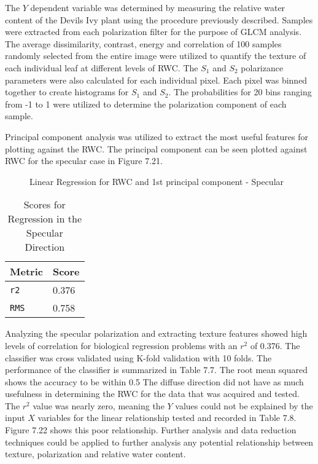 The $Y$ dependent variable was determined by measuring the relative water content of the Devils Ivy plant using the procedure previously described.  Samples were extracted from each polarization filter for the purpose of GLCM analysis.  The average dissimilarity, contrast, energy and correlation of 100 samples randomly selected from the entire image were utilized to quantify the texture of each individual leaf at different levels of RWC.  The $S_1$ and $S_2$ polarizance parameters were also calculated for each individual pixel. Each pixel was binned together to create histograms for $S_1$ and $S_2$.  The probabilities for 20 bins ranging from -1 to 1 were utilized to determine the polarization component of each sample.

Principal component analysis was utilized to extract the most useful features for plotting against the RWC.  The principal component can be seen plotted against RWC for the specular case in Figure 7.21.
%
\begin{figure}
    \begin{center}
    \end{center}
    \caption{Linear Regression for RWC and 1st principal component - Specular}
    \label{fig:polarization}
\end{figure}
%
%
\begin{table}
  \centering
  \begin{tabular}{ll}
    \toprule
    \textbf{Metric} & \textbf{Score}\\
    \midrule
      \texttt{r2} & 0.376 \\
      \texttt{RMS} & 0.758 \\
    \bottomrule
  \end{tabular}
  \caption{%
    Scores for Regression in the Specular Direction
  }
  \label{tab:Packages}
\end{table}
%
Analyzing the specular polarization and extracting texture features showed high levels of correlation for biological regression problems with an $r^2$ of 0.376.  The classifier was cross validated using K-fold validation with 10 folds.  The performance of the classifier is summarized in Table 7.7.
The root mean squared shows the accuracy to be within 0.5%
%
The diffuse direction did not have as much usefulness in determining the RWC for the data that was acquired and tested. The $r^2$ value was nearly zero, meaning the $Y$ values could not be explained by the input $X$ variables for the linear relationship tested and recorded in Table 7.8. Figure 7.22 shows this poor relationship.  Further analysis and data reduction techniques could be applied to further analysis any potential relationship between texture, polarization and relative water content.
